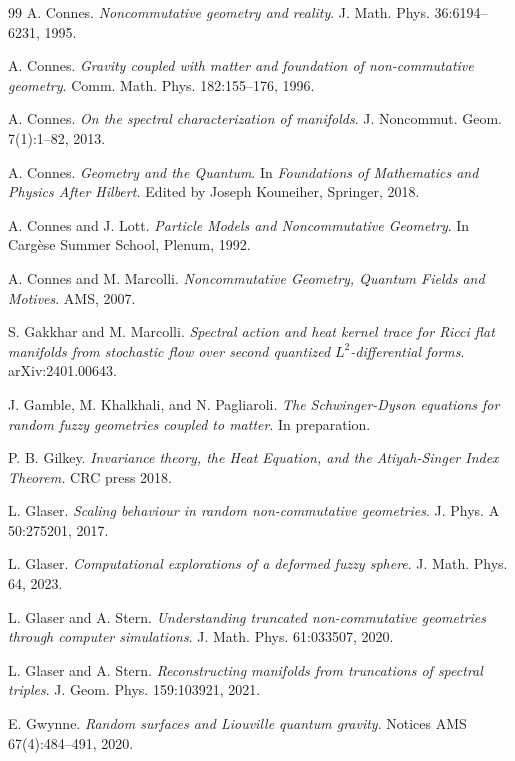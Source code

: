 \documentclass[11pt]{article}
\theoremstyle{plain}
\begin{document}
\begin{thebibliography}{99}
A. Connes. \emph{Noncommutative geometry and reality}. J. Math. Phys. 36:6194–6231, 1995.

A. Connes. \emph{Gravity coupled with matter and foundation of non-commutative geometry}. Comm. Math. Phys. 182:155–176, 1996.


A. Connes. \emph{On the spectral characterization of manifolds}. J. Noncommut. Geom. 7(1):1–82, 2013.

A. Connes. \emph{Geometry and the Quantum}. In {\it Foundations of Mathematics and Physics After Hilbert.} Edited by Joseph Kouneiher,  Springer, 2018.

A. Connes and J. Lott. \emph{Particle Models and Noncommutative Geometry}. In Cargèse Summer School, Plenum, 1992.

A. Connes and M. Marcolli. \emph{Noncommutative Geometry, Quantum Fields and Motives}. AMS, 2007.


	S. Gakkhar and M. Marcolli. \emph{Spectral action and heat kernel trace for Ricci flat manifolds from stochastic flow over second quantized {$L^{2}$}-differential forms}. arXiv:2401.00643.

J. Gamble, M. Khalkhali, and N. Pagliaroli. \emph{The Schwinger-Dyson equations for random fuzzy geometries coupled to matter}. In preparation. 


P. B. Gilkey. {\it Invariance theory, the Heat Equation, and the Atiyah-Singer Index Theorem.} CRC press 2018.





L. Glaser. \emph{Scaling behaviour in random non-commutative geometries}. J. Phys. A 50:275201, 2017.

L. Glaser. \emph{Computational explorations of a deformed fuzzy sphere}. J. Math. Phys. 64, 2023.

L. Glaser and A. Stern.
\emph{Understanding truncated non-commutative geometries through computer simulations}. J. Math. Phys. 61:033507, 2020.

L. Glaser and A. Stern.
\emph{Reconstructing manifolds from truncations of spectral triples}. J. Geom. Phys. 159:103921, 2021.

E. Gwynne. \emph{Random surfaces and Liouville quantum gravity}. Notices AMS 67(4):484–491, 2020.


\end{thebibliography}
\end{document}

